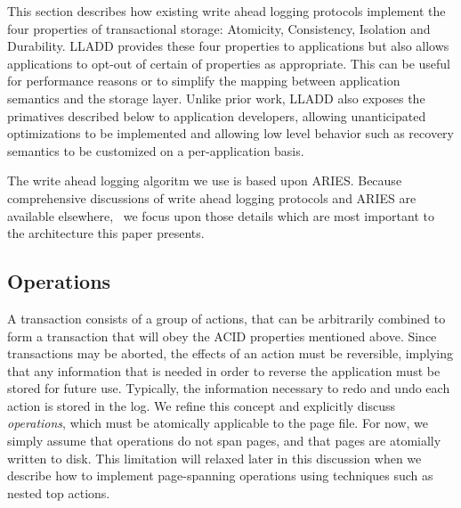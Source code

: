 \documentclass[letterpaper,english]{article}
\begin{document}
This section describes how existing write ahead logging protocols
implement the four properties of transactional storage: Atomicity,
Consistency, Isolation and Durability.  LLADD provides these four
properties to applications but also allows applications to opt-out of
certain of properties as appropriate.  This can be useful for
performance reasons or to simplify the mapping between application
semantics and the storage layer.  Unlike prior work, LLADD also
exposes the primatives described below to application developers,
allowing unanticipated optimizations to be implemented and allowing
low level behavior such as recovery semantics to be customized on a
per-application basis.

The write ahead logging algoritm we use is based upon ARIES. Because
comprehensive discussions of write ahead logging protocols and ARIES
are available elsewhere,~\cite{haerder, aries} we focus upon those
details which are most important to the architecture this paper
presents.



%


\subsection{Operations\label{sub:OperationProperties}}

A transaction consists of a group of actions, that can be arbitrarily
combined to form a transaction that will obey the ACID properties
mentioned above.  Since transactions may be aborted, the effects of an
action must be reversible, implying that any information that is
needed in order to reverse the application must be stored for future
use.  Typically, the information necessary to redo and undo each
action is stored in the log.  We refine this concept and explicitly
discuss {\em operations}, which must be atomically applicable to the
page file.  For now, we simply assume that operations do not span
pages, and that pages are atomially written to disk.  This limitation
will relaxed later in this discussion when we describe how to
implement page-spanning operations using techniques such as nested top
actions.
\end{document}
